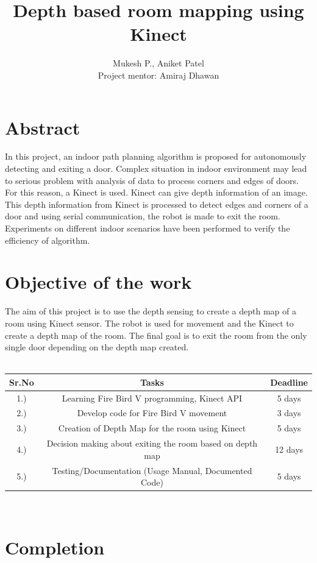 \documentclass{report}
\author{Mukesh P., Aniket Patel \\ Project mentor: Amiraj Dhawan}
\title{Depth based room mapping using Kinect}
\begin{document}
\maketitle
\tableofcontents


\chapter{Abstract}
In this project, an indoor path planning algorithm is proposed for autonomously detecting and exiting a door. Complex situation in indoor
environment may lead to serious problem with analysis of data to process corners and edges of doors. For this reason, a Kinect is used.
Kinect can give depth information of an image. This depth information from Kinect is processed to detect edges and corners of a door and using serial
communication, the robot is made to exit the room. Experiments on different indoor scenarios have been performed
to verify the efficiency of algorithm.
\chapter{Objective of the work}
The aim of this project is to use the depth sensing to create a depth map of a room using Kinect sensor. The robot is used for movement and the 
Kinect to create a depth map of the room. The final goal is to exit the room from the only single door depending on the depth map created. \\ \\

\begin{tabular}{ | c | c | c |}
	\hline\hline
	\bf Sr.No & \bf Tasks & \bf Deadline \\ 
	\hline
	1.) & Learning Fire Bird V programming, Kinect API & 5 days \\
	\hline
	2.) & Develop code for Fire Bird V movement & 3 days \\
	\hline
	3.) & Creation of Depth Map for the room using Kinect & 5 days \\
	\hline
	4.) & Decision making about exiting the room based on depth map & 12 days\\
	\hline
	5.) & Testing/Documentation (Usage Manual, Documented Code) & 5 days
	\\ \hline

\end{tabular} \\

\chapter{Completion}
\end{document}
